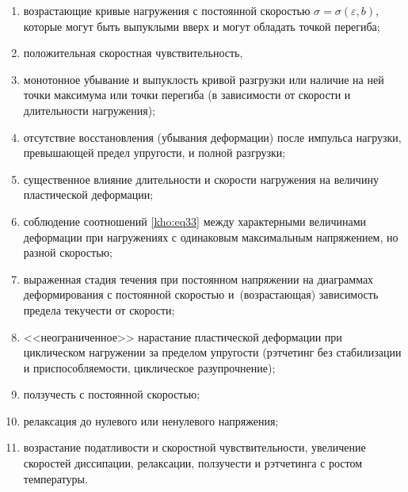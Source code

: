 \begin{enumerate}

\item  возрастающие кривые нагружения с постоянной скоростью $\sigma=\sigma(\varepsilon,b)$, которые могут быть выпуклыми вверх и могут обладать точкой перегиба; 

\item  положительная скоростная чувствительность, 

\item  монотонное убывание и выпуклость кривой разгрузки или наличие на ней точки максимума или точки перегиба (в зависимости от скорости и длительности нагружения); 

\item  отсутствие восстановления (убывания деформации) после импульса нагрузки, превышающей предел упругости, и полной разгрузки;

\item  существенное влияние длительности и скорости нагружения на величину пластической деформации; 

\item  соблюдение соотношений \eqref{kho:eq33} между характерными величинами деформации при нагружениях с одинаковым максимальным напряжением, но разной скоростью; 

\item  выраженная стадия течения при постоянном напряжении на диаграммах деформирования с постоянной скоростью и~(возрастающая) зависимость предела текучести от скорости; 

\item  <<неограниченное>> нарастание пластической деформации при циклическом нагружении за пределом упругости (рэтчетинг без стабилизации и приспособляемости, циклическое разупрочнение); 

\item  ползучесть с постоянной скоростью; 

\item  релаксация до нулевого или ненулевого напряжения;

\item  возрастание податливости и скоростной чувствительности, увеличение скоростей диссипации, релаксации, ползучести и рэтчетинга с ростом температуры.

\end{enumerate} 











